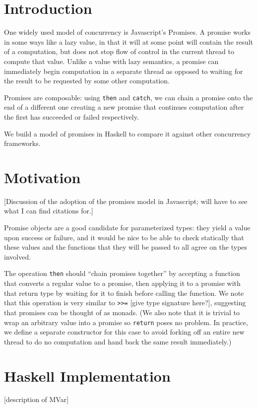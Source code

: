 \documentclass[sigplan,screen,review]{acmart}
\newcommand{\lit}[1]{\lstinline{#1}}
\begin{document}
\section{Introduction}
One widely used model of concurrency is Javascript's Promises.  A promise works in some ways like a lazy value, in that it will at some point will contain the result of a computation, but does not stop flow of control in the current thread to compute that value.  Unlike a value with lazy semantics, a promise can immediately begin computation in a separate thread as opposed to waiting for the result to be requested by some other computation.

Promises are composable: using \lit{then} and \lit{catch}, we can chain a promise onto the end of a different one creating a new promise that continues computation after the first has succeeded or failed respectively.

We build a model of promises in Haskell to compare it against other concurrency frameworks.
\section{Motivation}
[Discussion of the adoption of the promises model in Javascript; will have to see what I can find citations for.]

Promise objects are a good candidate for parameterized types: they yield a value upon success or failure, and it would be nice to be able to check statically that these values and the functions that they will be passed to all agree on the types involved.

The operation \lit{then} should ``chain promises together'' by accepting a function that converts a regular value to a promise, then applying it to a promise with that return type by waiting for it to finish before calling the function.  We note that this operation is very similar to \lit{>>=} [give type signature here?], suggesting that promises can be thought of as monads.  (We also note that it is trivial to wrap an arbitrary value into a promise so \lit{return} poses no problem.  In practice, we define a separate constructor for this case to avoid forking off an entire new thread to do no computation and hand back the same result immediately.)
\section{Haskell Implementation}

[description of MVar]
\end{document}
